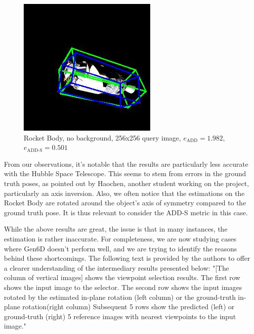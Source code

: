 \begin{figure}[h]
\begin{minipage}{0.45\linewidth}
        \includegraphics[width=\linewidth]{data/fig10.jpg} %
        \caption{Rocket Body, no background, 256x256 query image, $e_\mathrm{ADD}=1.982$, $e_{\mathrm{ADD}\text{-}\mathrm{S}}=0.501$ }
        \label{fig:fig10}
    \end{minipage}
\end{figure}

\bigskip

From our observations, it's notable that the results are particularly less accurate with the Hubble Space Telescope. This seems to stem from errors in the ground truth poses, as pointed out by Haochen, another student working on the project, particularly an axis inversion. Also, we often notice that the estimations on the Rocket Body are rotated around the object's axis of symmetry compared to the ground truth pose. It is thus relevant to consider the ADD-S metric in this case.

\bigskip

\cleardoublepage{}
While the above results are great, the issue is that in many instances, the estimation is rather inaccurate.
For completeness, we are now studying cases where Gen6D doesn't perform well, and we are trying to identify the reasons behind these shortcomings. The following text is provided by the authors to offer a clearer understanding of the intermediary results presented below: "[The column of vertical images] shows the viewpoint selection results. The first row shows the input image to the selector. The second row shows the input images rotated by the estimated in-plane rotation (left column) or the ground-truth in-plane rotation(right column) Subsequent 5 rows show the predicted (left) or ground-truth (right) 5 reference images with nearest viewpoints to the input image."

